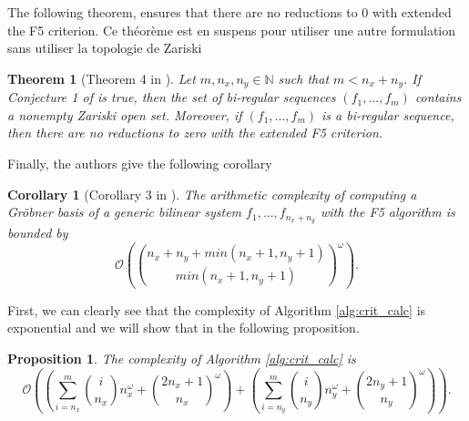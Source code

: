 \documentclass[english]{article}
\newtheorem{proposition}{Proposition}[section]
\newtheorem{theorem}{Theorem}[section]
\newtheorem{corollary}{Corollary}[section]
\begin{document}
		 The following theorem, ensures that there are no reductions to 0 with extended the F5 criterion. Ce théorème est en suspens pour utiliser une autre formulation sans utiliser la topologie de Zariski
		 
		 \begin{theorem}[Theorem 4 in \cite{FSS11}]
		 	Let $m, n_x, n_y \in \mathbb{N}$ such that $m < n_x + n_y$. If Conjecture 1 of \cite{FSS11} is true, then the set of bi-regular sequences $(f_1,...,f_m)$ contains a nonempty Zariski open set. Moreover, if $(f_1,...,f_m)$ is a bi-regular sequence, then there are no reductions to zero with the extended F5 criterion.
		 \end{theorem}
		 
		 Finally, the authors give the following corollary 
		 
		 \begin{corollary}[Corollary 3 in \cite{FSS11}]
		 The arithmetic complexity of computing a Gröbner basis of a generic bilinear system $f_1,...,f_{n_x + n_y}$ with the F5 algorithm is bounded by
		 $$\mathcal{O}\left(\binom{n_x + n_y + min(n_x + 1, n_y + 1)}{min(n_x + 1, n_y + 1)}^\omega\right).$$
		 \end{corollary}
		 
		 First, we can clearly see that the complexity of Algorithm \ref{alg:crit_calc} is exponential and we will show that in the following proposition.
		 
		 \begin{proposition}\label{complexCrit}
		 	The complexity of Algorithm \ref{alg:crit_calc} is
		 	$$
		 	\mathcal{O}\left(\left(\sum_{i = n_x}^{m} \binom{i}{n_x}n_x^{\omega} + \binom{2n_x + 1}{n_x}^\omega\right) + \left(\sum_{i = n_y}^{m} \binom{i}{n_y}n_y^{\omega} + \binom{2n_y + 1}{n_y}^\omega\right)\right).
		 	$$
		 \end{proposition}
		 
\end{document}

